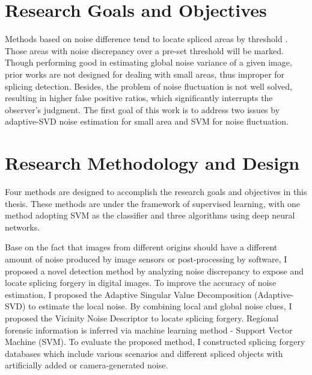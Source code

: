 \documentclass[a4paper, 12pt, twoside]{report}
\begin{document}
\section{Research Goals and Objectives}
Methods based on noise difference tend to locate spliced areas by threshold \cite{Lyu}. Those areas with noise discrepancy over a pre-set threshold will be marked. Though performing good in estimating global noise variance of a given image, prior works are not designed for dealing with small areas, thus improper for splicing detection. Besides, the problem of noise fluctuation is not well solved, resulting in higher false positive ratios, which significantly interrupts the observer's judgment. The first goal of this work is to address two issues by adaptive-SVD noise estimation for small area and SVM for noise fluctuation.

\section{Research Methodology and Design}
Four methods are designed to accomplish the research goals and objectives in this thesis. These methods are under the framework of supervised learning, with one method adopting SVM as the classifier and three algorithms using deep neural networks.

Base on the fact that images from different origins should have a different amount of noise produced by image sensors or post-processing by software, I proposed a novel detection method by analyzing noise discrepancy to expose and locate splicing forgery in digital images. To improve the accuracy of noise estimation, I proposed the Adaptive Singular Value Decomposition (Adaptive-SVD) to estimate the local noise. By combining local and global noise clues, I proposed the Vicinity Noise Descriptor to locate splicing forgery. Regional forensic information is inferred via machine learning method - Support Vector Machine (SVM). To evaluate the proposed method, I constructed splicing forgery databases which include various scenarios and different spliced objects with artificially added or camera-generated noise. 
\end{document}
